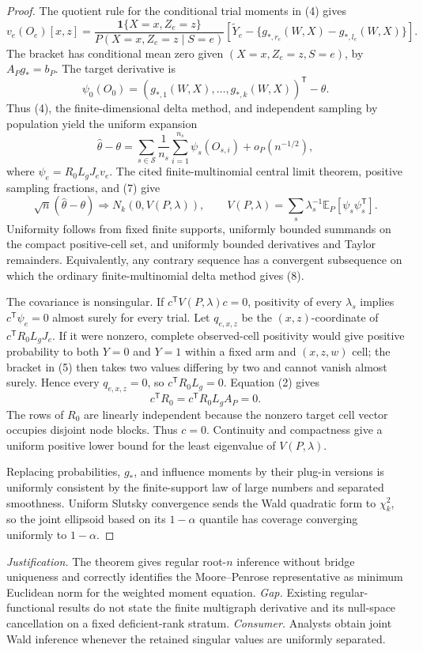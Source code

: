 \documentclass{article}
\begin{document}
\begin{proof}
The quotient rule for the conditional trial moments in (4) gives
\[
v_e(O_e)[x,z]=
\frac{\mathbf 1\{X=x,Z_e=z\}}{P(X=x,Z_e=z\mid S=e)}
\left[\widetilde Y_e-\{g_{*,r_e}(W,X)-g_{*,l_e}(W,X)\}\right].
\tag{5}
\]
The bracket has conditional mean zero given \((X=x,Z_e=z,S=e)\), by \(A_Pg_*=b_P\).  The target derivative is
\[
\psi_0(O_0)=
(g_{*,1}(W,X),\ldots,g_{*,k}(W,X))^{\mathsf T}-\theta.
\tag{6}
\]
Thus (4), the finite-dimensional delta method, and independent sampling by population yield the uniform expansion
\[
\widehat\theta-\theta
=\sum_{s\in\mathcal S}\frac1{n_s}\sum_{i=1}^{n_s}\psi_s(O_{s,i})
+o_P(n^{-1/2}),
\tag{7}
\]
where \(\psi_e=R_0L_gJ_ev_e\).  The cited finite-multinomial central limit theorem, positive sampling fractions, and (7) give
\[
\sqrt n(\widehat\theta-\theta)\Longrightarrow
N_k(0,V(P,\lambda)),
\qquad
V(P,\lambda)=\sum_s\lambda_s^{-1}\mathbb E_P[\psi_s\psi_s^{\mathsf T}].
\tag{8}
\]
Uniformity follows from fixed finite supports, uniformly bounded summands on the compact positive-cell set, and uniformly bounded derivatives and Taylor remainders.  Equivalently, any contrary sequence has a convergent subsequence on which the ordinary finite-multinomial delta method gives (8).

The covariance is nonsingular.  If \(c^{\mathsf T}V(P,\lambda)c=0\), positivity of every \(\lambda_s\) implies \(c^{\mathsf T}\psi_e=0\) almost surely for every trial.  Let \(q_{e,x,z}\) be the \((x,z)\)-coordinate of \(c^{\mathsf T}R_0L_gJ_e\).  If it were nonzero, complete observed-cell positivity would give positive probability to both \(Y=0\) and \(Y=1\) within a fixed arm and \((x,z,w)\) cell; the bracket in (5) then takes two values differing by two and cannot vanish almost surely.  Hence every \(q_{e,x,z}=0\), so \(c^{\mathsf T}R_0L_g=0\).  Equation (2) gives
\[
c^{\mathsf T}R_0=c^{\mathsf T}R_0L_gA_P=0.
\]
The rows of \(R_0\) are linearly independent because the nonzero target cell vector occupies disjoint node blocks.  Thus \(c=0\).  Continuity and compactness give a uniform positive lower bound for the least eigenvalue of \(V(P,\lambda)\).

Replacing probabilities, \(g_*\), and influence moments by their plug-in versions is uniformly consistent by the finite-support law of large numbers and separated smoothness.  Uniform Slutsky convergence sends the Wald quadratic form to \(\chi_k^2\), so the joint ellipsoid based on its \(1-\alpha\) quantile has coverage converging uniformly to \(1-\alpha\).
\end{proof}
\par\smallskip\noindent \textit{Justification.} The theorem gives regular root-\(n\) inference without bridge uniqueness and correctly identifies the Moore--Penrose representative as minimum Euclidean norm for the weighted moment equation. \textit{Gap.} Existing regular-functional results do not state the finite multigraph derivative and its null-space cancellation on a fixed deficient-rank stratum. \textit{Consumer.} Analysts obtain joint Wald inference whenever the retained singular values are uniformly separated.
\end{document}
